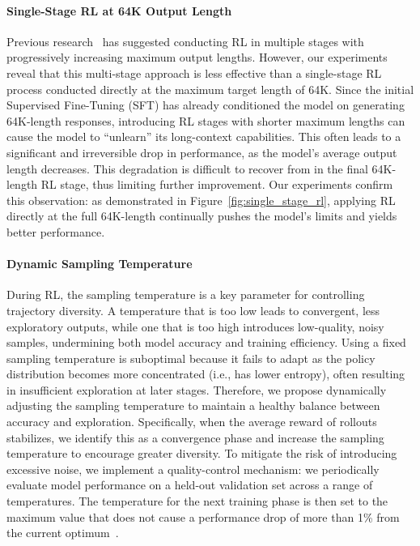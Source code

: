 \paragraph{Single-Stage RL at 64K Output Length}
Previous research~\cite{deepscaler2025} has suggested conducting RL in multiple stages with progressively increasing maximum output lengths. However, our experiments reveal that this multi-stage approach is less effective than a single-stage RL process conducted directly at the maximum target length of 64K. Since the initial Supervised Fine-Tuning (SFT) has already conditioned the model on generating 64K-length responses, introducing RL stages with shorter maximum lengths can cause the model to ``unlearn'' its long-context capabilities. This often leads to a significant and irreversible drop in performance, as the model's average output length decreases. This degradation is difficult to recover from in the final 64K-length RL stage, thus limiting further improvement. Our experiments confirm this observation: as demonstrated in Figure~\ref{fig:single_stage_rl}, applying RL directly at the full 64K-length continually pushes the model's limits and yields better performance.

\paragraph{Dynamic Sampling Temperature}
During RL, the sampling temperature is a key parameter for controlling trajectory diversity. A temperature that is too low leads to convergent, less exploratory outputs, while one that is too high introduces low-quality, noisy samples, undermining both model accuracy and training efficiency. Using a fixed sampling temperature is suboptimal because it fails to adapt as the policy distribution becomes more concentrated (i.e., has lower entropy), often resulting in insufficient exploration at later stages. Therefore, we propose dynamically adjusting the sampling temperature to maintain a healthy balance between accuracy and exploration. Specifically, when the average reward of rollouts stabilizes, we identify this as a convergence phase and increase the sampling temperature to encourage greater diversity. To mitigate the risk of introducing excessive noise, we implement a quality-control mechanism: we periodically evaluate model performance on a held-out validation set across a range of temperatures. The temperature for the next training phase is then set to the maximum value that does not cause a performance drop of more than 1\% from the current optimum~\cite{Polaris2025}.


